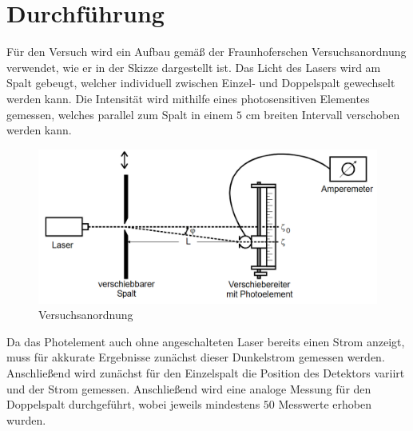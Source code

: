 \section{Durchführung}
Für den Versuch wird ein Aufbau gemäß der Fraunhoferschen Versuchsanordnung verwendet, wie er in der Skizze dargestellt ist.
Das Licht des Lasers wird am Spalt gebeugt, welcher individuell zwischen Einzel- und Doppelspalt gewechselt werden kann.
Die Intensität wird mithilfe eines photosensitiven Elementes gemessen, welches parallel zum Spalt in einem $5$ cm breiten 
Intervall verschoben werden kann. \\
\begin{figure}[h]
    \centering
    \includegraphics[width=14cm, keepaspectratio]{Beugung am Spalt Versuchsanordnung}
    \caption{Versuchsanordnung}
  \end{figure}
Da das Photelement auch ohne angeschalteten Laser bereits einen Strom anzeigt, muss für akkurate Ergebnisse zunächst 
dieser Dunkelstrom gemessen werden. Anschließend wird zunächst für den Einzelspalt die Position des Detektors variirt und
der Strom gemessen. Anschließend wird eine analoge Messung für den Doppelspalt durchgeführt, wobei jeweils mindestens $50$ Messwerte
erhoben wurden.
